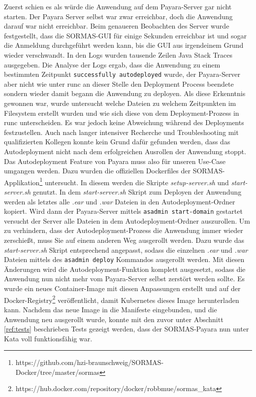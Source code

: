 Zuerst schien es als würde die Anwendung auf dem Payara-Server gar nicht starten. 
Der Payara Server selbst war zwar erreichbar, doch die Anwendung darauf war nicht erreichbar.
Beim genaueren Beobachten des Server wurde festgestellt, dass die \ac{SORMAS}-\ac{GUI} für einige Sekunden erreichbar ist und sogar die Anmeldung durchgeführt werden kann, bis die \ac{GUI} aus irgendeinem Grund wieder verschwandt.
In den Logs wurden tausende Zeilen Java Stack Traces ausgegeben.
Die Analyse der Logs ergab, dass die Anwendung zu einem bestimmten Zeitpunkt \texttt{successfully autodeployed} wurde, der Payara-Server aber nicht wie unter runc an dieser Stelle den Deployment Process beendete sondern wieder damit begann die Anwendung zu deployen.
Als diese Erkenntnis gewonnen war, wurde untersucht welche Dateien zu welchem Zeitpunkten im Filesystem erstellt wurden und wie sich diese von dem Deployment-Prozess in runc unterscheiden. 
Es war jedoch keine Abweichung während des Deployments festzustellen.
Auch nach langer intensiver Recherche und Troubleshooting mit qualifizierten Kollegen konnte kein Grund dafür gefunden werden, dass das Autodeployment nicht nach dem erfolgreichen Ausrollen der Anwendung stoppt. 
\\
Das Autodeployment Feature von Payara muss also für unseren Use-Case umgangen werden. 
Dazu wurden die offiziellen Dockerfiles der \ac{SORMAS}-Applikation\footnote{https://github.com/hzi-braunschweig/SORMAS-Docker/tree/master/sormas} untersucht. 
In diesem werden die Skripte \textit{setup-server.sh} und \textit{start-server.sh} genutzt.
In dem \textit{start-server.sh} Skript zum Deployen der Anwendung werden als letztes alle \textit{.ear} und \textit{.war} Dateien in den Autodeployment-Ordner kopiert.
Wird dann der Payara-Server mittels \texttt{asadmin start-domain} gestartet versucht der Server alle Dateien in dem Autodeployment-Ordner auszurollen.
Um zu verhindern, dass der Autodeployment-Prozess die Anwendung immer wieder zerschießt, muss Sie auf einem anderen Weg ausgerollt werden.
Dazu wurde das \textit{start-server.sh} Skript entsprechend angepasst, sodass die einzelnen \textit{.ear} und \textit{.war} Dateien mittels des \texttt{asadmin deploy} Kommandos ausgerollt werden.
Mit diesen Änderungen wird die Autodeployment-Funktion komplett ausgesetzt, sodass die Anwendung nun nicht mehr vom Payara-Server selbst zerstört werden sollte.
Es wurde ein neues Container-Image mit diesen Anpassungen erstellt und auf der Docker-Registry\footnote{https://hub.docker.com/repository/docker/robbmue/sormas\_kata} veröffentlicht, damit Kubernetes dieses Image herunterladen kann.
Nachdem das neue Image in die Manifeste eingebunden, und die Anwendung neu ausgerollt wurde, konnte mit den zuvor unter Abschnitt \ref{ref:tests} beschrieben Tests gezeigt werden, dass der \ac{SORMAS}-Payara nun unter Kata voll funktionsfähig war.


